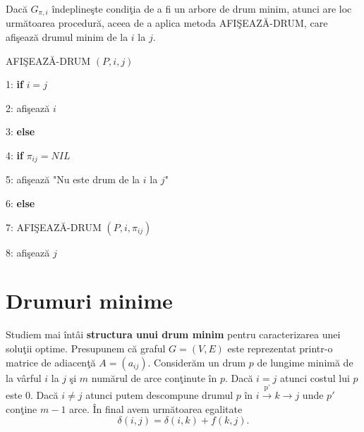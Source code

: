\documentclass[11pt,a4paper]{report}
\begin{document}
     Dac\u a $G_{\pi,i} $ \^ indepline\c ste condi\c tia de a fi un arbore de drum minim, atunci are loc urm\u atoarea procedur\u a, aceea de a aplica metoda AFI\c SEAZ\u A-DRUM, care afi\c seaz\u a drumul minim de la $i$ la $j$.
     
       \vspace{0.3cm}
     AFI\c SEAZ\u A-DRUM $(P,i,j)$
     
     \vspace{0.1cm}
     1: \textbf{if} $i=j$ 
     
     2:\hspace{0.6cm} afi\c seaz\u a  $i$
     
     3: \textbf{else}
     
     4: \hspace{0.6cm}\textbf{if} $\pi_{ij}=NIL$ 
     
     5:\hspace{1.2cm} afi\c seaz\u a "Nu este drum de la $i$ la $j$" 
     
     6:\hspace{0.6cm} \textbf{else}
     
     7:\hspace{1.2cm} AFI\c SEAZ\u A-DRUM $(P,i,\pi_{ij})$
     
     8:\hspace{1.2cm} afi\c seaz\u a $j$
     \vspace{0.3cm}
     
     \section{Drumuri minime }
     
     Studiem mai \^ int\^ ai \textbf{structura unui drum minim} pentru caracterizarea unei solu\c tii optime. Presupunem  c\u a graful $G=(V,E)$ este reprezentat printr-o matrice de adiacen\c t\u a $A=(a_{ij})$. Consider\u am un drum $p$ de lungime minim\u a de la v\^ arful $i$ la $j$ \c si $m$ num\u arul de arce con\c tinute \^ in $p$. Dac\u a $i=j$ atunci costul lui $p$ este 0. Dac\u a $i\neq j$ atunci putem descompune drumul $p$ \^ in $i\xrightarrow{\text{p'}}k\rightarrow j$ unde $p'$ con\c tine $m-1$ arce. \^ In final avem urm\u atoarea egalitate 
     \begin{equation*}
     \delta (i,j)=\delta (i,k)+f(k,j).
     \end{equation*}
     
\end{document}

